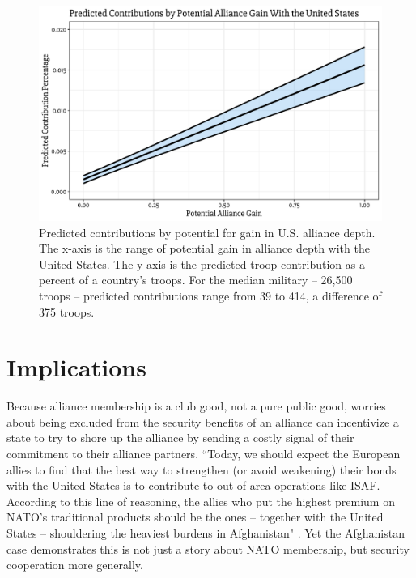 \documentclass[12pt,letterpaper]{article}
\begin{document}
		\begin{figure}[ht]
			\centering
			\includegraphics[scale = 0.75]{figures/pred_contr.pdf}
			\caption{Predicted contributions by potential for gain in U.S. alliance depth. The x-axis is the range of potential gain in alliance depth with the United States. The y-axis is the predicted troop contribution as a percent of a country's troops. For the median military -- 26,500 troops -- predicted contributions range from 39 to 414, a difference of 375 troops.}
		\end{figure}

\section{Implications}
	Because alliance membership is a club good, not a pure public good, worries about being excluded from the security benefits of an alliance can incentivize a state to try to shore up the alliance by sending a costly signal of their commitment to their alliance partners. ``Today, we should expect the European allies to find that the best way to strengthen (or avoid weakening) their bonds with the United States is to contribute to out-of-area operations like ISAF. According to this line of reasoning, the allies who put the highest premium on NATO’s traditional products should be the ones – together with the United States – shouldering the heaviest burdens in Afghanistan" \citep[331]{ringsmose_natoburdensharingredux_2010}. Yet the Afghanistan case demonstrates this is not just a story about NATO membership, but security cooperation more generally.
\end{document}

